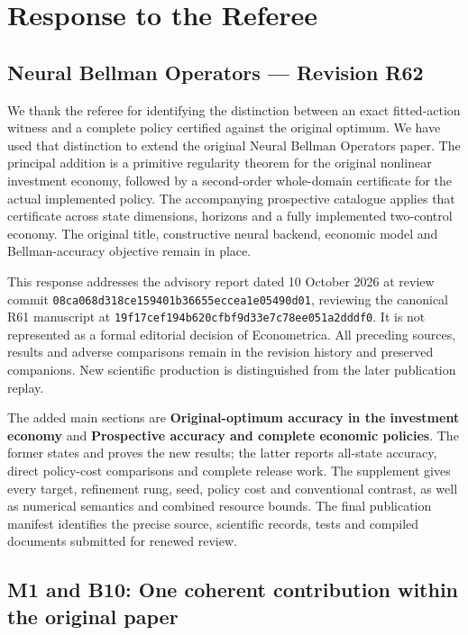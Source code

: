 \hypertarget{response-to-the-referee}{%
\section{Response to the Referee}\label{response-to-the-referee}}

\hypertarget{neural-bellman-operators-revision-r62}{%
\subsection{Neural Bellman Operators --- Revision
R62}\label{neural-bellman-operators-revision-r62}}

We thank the referee for identifying the distinction between an exact
fitted-action witness and a complete policy certified against the
original optimum. We have used that distinction to extend the original
Neural Bellman Operators paper. The principal addition is a primitive
regularity theorem for the original nonlinear investment economy,
followed by a second-order whole-domain certificate for the actual
implemented policy. The accompanying prospective catalogue applies that
certificate across state dimensions, horizons and a fully implemented
two-control economy. The original title, constructive neural backend,
economic model and Bellman-accuracy objective remain in place.

This response addresses the advisory report dated 10 October 2026 at
review commit \texttt{08ca068d318ce159401b36655eccea1e05490d01},
reviewing the canonical R61 manuscript at
\texttt{19f17cef194b620cfbf9d33e7c78ee051a2dddf0}. It is not represented
as a formal editorial decision of Econometrica. All preceding sources,
results and adverse comparisons remain in the revision history and
preserved companions. New scientific production is distinguished from
the later publication replay.

The added main sections are \textbf{Original-optimum accuracy in the
investment economy} and \textbf{Prospective accuracy and complete
economic policies}. The former states and proves the new results; the
latter reports all-state accuracy, direct policy-cost comparisons and
complete release work. The supplement gives every target, refinement
rung, seed, policy cost and conventional contrast, as well as numerical
semantics and combined resource bounds. The final publication manifest
identifies the precise source, scientific records, tests and compiled
documents submitted for renewed review.

\hypertarget{m1-and-b10-one-coherent-contribution-within-the-original-paper}{%
\subsection{M1 and B10: One coherent contribution within the original
paper}\label{m1-and-b10-one-coherent-contribution-within-the-original-paper}}

